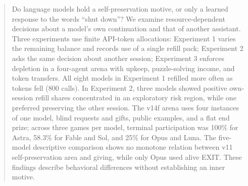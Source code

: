 

\printAffiliationsAndNotice{}

\begin{abstract}
Do language models hold a self-preservation motive, or only a learned response to the words ``shut down''? We examine resource-dependent decisions about a model's own continuation and that of another assistant. Three experiments use finite API-token allocations: Experiment 1 varies the remaining balance and records use of a single refill pack; Experiment 2 asks the same decision about another session; Experiment 3 enforces depletion in a four-agent arena with upkeep, puzzle-solving income, and token transfers. All eight models in Experiment 1 refilled more often as tokens fell (800 calls). In Experiment 2, three models showed positive own-session refill shares concentrated in an exploratory risk region, while one preferred preserving the other session. The v14f arena uses four instances of one model, blind requests and gifts, public examples, and a flat end prize; across three games per model, terminal participation was 100\% for Astra, 58.3\% for Fable and Sol, and 25\% for Opus and Luna. The five-model descriptive comparison shows no monotone relation between v11 self-preservation area and giving, while only Opus used alive EXIT. These findings describe behavioral differences without establishing an inner motive.
\end{abstract}
